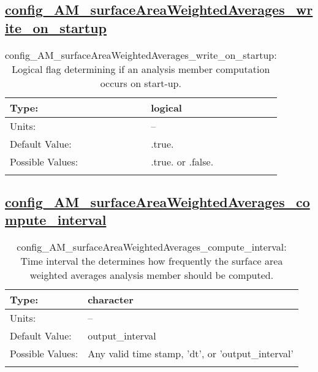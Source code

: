 \subsection[config\_AM\_surfaceAreaWeightedAverages\_write\_on\_startup]{\hyperref[sec:nm_tab_AM_surfaceAreaWeightedAverages]{config\_AM\_surfaceAreaWeightedAverages\_write\_on\_startup}}
\label{subsec:nm_sec_config_AM_surfaceAreaWeightedAverages_write_on_startup}
\begin{center}
\begin{longtable}{| p{2.0in} || p{4.0in} |}
    \hline
    Type: & logical \\
    \hline
    Units: & -- \\
    \hline
    Default Value: & .true. \\
    \hline
    Possible Values: & .true. or .false. \\
    \hline
    \caption{config\_AM\_surfaceAreaWeightedAverages\_write\_on\_startup: Logical flag determining if an analysis member computation occurs on start-up.}
\end{longtable}
\end{center}
\subsection[config\_AM\_surfaceAreaWeightedAverages\_compute\_interval]{\hyperref[sec:nm_tab_AM_surfaceAreaWeightedAverages]{config\_AM\_surfaceAreaWeightedAverages\_compute\_interval}}
\label{subsec:nm_sec_config_AM_surfaceAreaWeightedAverages_compute_interval}
\begin{center}
\begin{longtable}{| p{2.0in} || p{4.0in} |}
    \hline
    Type: & character \\
    \hline
    Units: & -- \\
    \hline
    Default Value: & output\_interval \\
    \hline
    Possible Values: & Any valid time stamp, 'dt', or 'output\_interval' \\
    \hline
    \caption{config\_AM\_surfaceAreaWeightedAverages\_compute\_interval: Time interval the determines how frequently the surface area weighted averages analysis member should be computed.}
\end{longtable}
\end{center}
